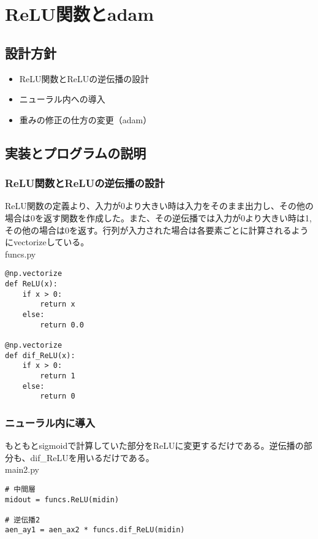 \documentclass{ujarticle}
\begin{document}
\section{ReLU関数とadam}
\subsection{設計方針}
\begin{itemize}
\item ReLU関数とReLUの逆伝播の設計
\item ニューラル内への導入
\item 重みの修正の仕方の変更（adam）
\end{itemize}

\subsection{実装とプログラムの説明}
\subsubsection{ReLU関数とReLUの逆伝播の設計}
ReLU関数の定義より、入力が0より大きい時は入力をそのまま出力し、その他の場合は0を返す関数を作成した。また、その逆伝播では入力が0より大きい時は1,その他の場合は0を返す。行列が入力された場合は各要素ごとに計算されるようにvectorizeしている。\\
funcs.py
\begin{lstlisting}[basicstyle=\ttfamily\footnotesize, frame=single]
@np.vectorize
def ReLU(x):
    if x > 0:
        return x
    else:
        return 0.0
        
@np.vectorize
def dif_ReLU(x):
    if x > 0:
        return 1
    else:
        return 0
\end{lstlisting}



\subsubsection{ニューラル内に導入}
もともとsigmoidで計算していた部分をReLUに変更するだけである。逆伝播の部分も、dif\_ReLUを用いるだけである。\\
main2.py
\begin{lstlisting}[basicstyle=\ttfamily\footnotesize, frame=single]
# 中間層
midout = funcs.ReLU(midin)

# 逆伝播2
aen_ay1 = aen_ax2 * funcs.dif_ReLU(midin)
\end{lstlisting}
\end{document}
